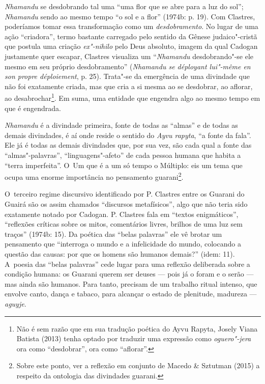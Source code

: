 \emph{Nhamandu} se desdobrando tal uma ``uma flor que se abre para a luz do
sol''; \emph{Nhamandu} sendo ao mesmo tempo ``o sol e a flor'' (1974b: p. 19).
Com Clastres, poderíamos tomar essa transformação como um
\emph{desdobramento}. No lugar de uma ação ``criadora'', termo bastante
carregado pelo sentido da Gênese judaico"-cristã que postula uma criação
\emph{ex"-nihilo} pelo Deus absoluto, imagem da qual Cadogan justamente
quer escapar, Clastres visualiza um ``\emph{Nhamandu} desdobrando"-se ele mesmo
em seu próprio desdobramento'' (\emph{Nhamandu se déployant lui"-même en son
propre déploiement}, p. 25). Trata"-se da emergência de uma divindade
que não foi exatamente criada, mas que cria a si mesma ao se desdobrar,
ao aflorar, ao desabrochar\footnote{Não é sem razão que em sua
tradução poética do Ayvu Rapyta, Josely Viana Batista (2013) tenha
optado por traduzir uma expressão como \emph{oguero"-jera} ora como
``desdobrar'', ora como ``aflorar''.}. Em suma, uma entidade que engendra
algo ao mesmo tempo em que é engendrada.

\emph{Nhamandu} é a divindade primeira, fonte de todas as ``almas'' e de todas as
demais divindades, é aí onde reside o sentido do \emph{Ayvu rapyta}, ``a fonte
da fala''. Ele já é todas as demais divindades que, por sua vez, são
cada qual a fonte das ``almas"-palavras'', ``linguagens"-afeto'' de cada
pessoa humana que habita a ``terra imperfeita''. O~Um que é a um só tempo
o Múltiplo: eis um tema que ocupa uma enorme importância no pensamento
guarani\footnote{Sobre este ponto, ver a reflexão em conjunto de
Macedo \& Sztutman (2015) a respeito da ontologia das divindades
guarani.}.

O~terceiro regime discursivo identificado por P. Clastres entre os
Guarani do Guairá são os assim chamados ``discursos metafísicos'', algo
que não teria sido exatamente notado por Cadogan. P. Clastres fala em
``textos enigmáticos'', ``reflexões críticas sobre os mitos, comentários
livres, brilhos de uma luz sem traços'' (1974b: 15). Da poética das
``belas palavras'' ele vê brotar um pensamento que ``interroga o mundo e a
infelicidade do mundo, colocando a questão das causas: por que os
homens são humanos demais?'' (idem: 11). A~poesia das ``belas palavras''
cede lugar para uma reflexão deliberada sobre a condição humana: os
Guarani querem ser deuses --- pois já o foram e o serão --- mas ainda são
humanos. Para tanto, precisam de um trabalho ritual intenso, que
envolve canto, dança e tabaco, para alcançar o estado de plenitude,
madureza --- \emph{aguyje}. 

